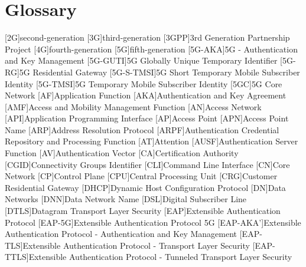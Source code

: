 \chapter{Glossary}

\footnotesize
\SingleSpacing

\begin{multicols}{2}
    \begin{acronym}[WPA]
        [2G]{second-generation}
        [3G]{third-generation}
        [3GPP]{3rd Generation Partnership Project}
        [4G]{fourth-generation}
        [5G]{fifth-generation}
        [5G-AKA]{5G - Authentication and Key Management}
        [5G-GUTI]{5G Globally Unique Temporary Identifier}
        [5G-RG]{5G Residential Gateway}
        [5G-S-TMSI]{5G Short Temporary Mobile Subscriber Identity}
        [5G-TMSI]{5G Temporary Mobile Subscriber Identity}
        [5GC]{5G Core Network}
        [AF]{Application Function}
        [AKA]{Authentication and Key Agreement}
        [AMF]{Access and Mobility Management Function}
        [AN]{Access Network}
        [API]{Application Programming Interface}
        [AP]{Access Point}
        [APN]{Access Point Name}
        [ARP]{Address Resolution Protocol}
        [ARPF]{Authentication Credential Repository and Processing Function}
        [AT]{Attention}
        [AUSF]{Authentication Server Function}
        [AV]{Authentication Vector}
        [CA]{Certification Authority}
        [CGID]{Connectivity Groups Identifier}
        [CLI]{Command Line Interface}
        [CN]{Core Network}
        [CP]{Control Plane}
        [CPU]{Central Processing Unit}
        [CRG]{Customer Residential Gateway}
        [DHCP]{Dynamic Host Configuration Protocol}
        [DN]{Data Networks}
        [DNN]{Data Network Name}
        [DSL]{Digital Subscriber Line}
        [DTLS]{Datagram Transport Layer Security}
        [EAP]{Extensible Authentication Protocol}
        [EAP-5G]{Extensible Authentication Protocol 5G}
        [EAP-AKA']{Extensible Authentication Protocol - Authentication and Key Management}
        [EAP-TLS]{Extensible Authentication Protocol - Transport Layer Security}
        [EAP-TTLS]{Extensible Authentication Protocol - Tunneled Transport Layer Security}

\end{acronym}
\end{multicols}
